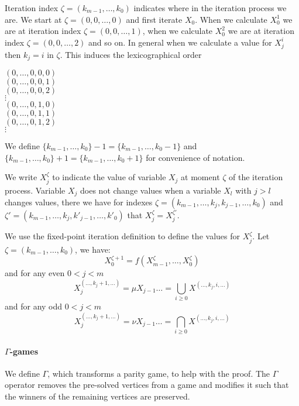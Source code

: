 Iteration index $\zeta = (k_{m-1},\dots,k_0)$ indicates where in the iteration process we are. We start at $\zeta = (0,0,\dots,0)$ and first iterate $X_0$. When we calculate $X_0^1$ we are at iteration index $\zeta=(0,0,\dots,1)$, when we calculate $X_0^2$ we are at iteration index $\zeta=(0,0,\dots,2)$ and so on. In general when we calculate a value for $X_j^i$ then $k_j = i$ in $\zeta$. This induces the lexicographical order 
\begin{center}
	$(0,\dots,0,0,0)$\\
	$(0,\dots,0,0,1)$\\
	$(0,\dots,0,0,2)$\\
	$\vdots$\\
	$(0,\dots,0,1,0)$\\
	$(0,\dots,0,1,1)$\\
	$(0,\dots,0,1,2)$\\
	$\vdots$
\end{center}
We define $\{k_{m-1},\dots,k_0\} -1 = \{k_{m-1},\dots,k_0-1\}$ and $\{k_{m-1},\dots,k_0\} + 1 = \{k_{m-1},\dots,k_0+1\}$ for convenience of notation.

We write $X_j^\zeta$ to indicate the value of variable $X_j$ at moment $\zeta$ of the iteration process. Variable $X_j$ does not change values when a variable $X_l$ with $j>l$ changes values, there we have for indexes $\zeta = (k_{m-1},\dots,k_j,k_{j-1},\dots,k_0)$ and $\zeta' = (k_{m-1},\dots,k_j,k'_{j-1},\dots,k'_0)$ that $X_j^\zeta = X_j^{\zeta'}$.

We use the fixed-point iteration definition to define the values for $X_j^\zeta$. Let  $\zeta= (k_{m-1},\dots,k_0)$, we have:
\[ X_0^{\zeta+1} = f(X_{m-1}^\zeta,\dots,X_0^\zeta) \]
and for any even $0 < j < m$
\[ X_j^{(\dots,k_j+1,\dots)} = \mu X_{j-1}\dots = \bigcup_{i \geq 0}X^{(\dots,k_j,i,\dots)} \]
and for any odd $0 < j < m$
\[ X_j^{(\dots,k_j+1,\dots)} = \nu X_{j-1}\dots = \bigcap_{i \geq 0}X^{(\dots,k_j,i,\dots)} \]

\paragraph{$\Gamma$-games} 

We define $\Gamma$, which transforms a parity game, to help with the proof. The $\Gamma$ operator removes the pre-solved vertices from a game and modifies it such that the winners of the remaining vertices are preserved.

